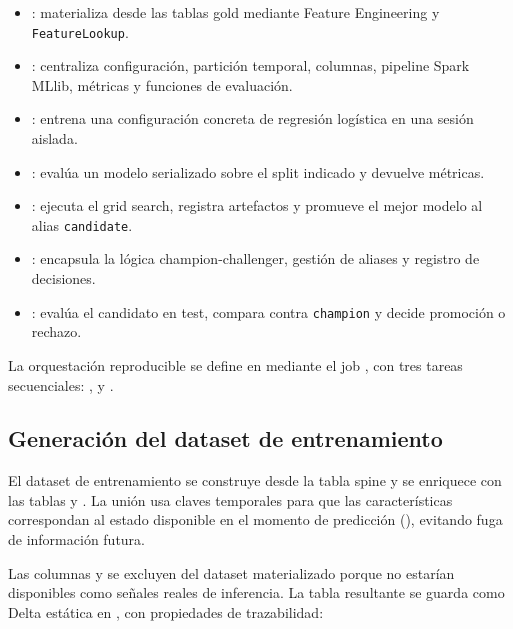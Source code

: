 \documentclass[12pt,a4paper]{article}
\begin{document}
\begin{itemize}
    \item {}: materializa  desde las tablas gold mediante Feature Engineering y \texttt{FeatureLookup}.
    \item {}: centraliza configuración, partición temporal, columnas, pipeline Spark MLlib, métricas y funciones de evaluación.
    \item {}: entrena una configuración concreta de regresión logística en una sesión aislada.
    \item {}: evalúa un modelo serializado sobre el split indicado y devuelve métricas.
    \item {}: ejecuta el grid search, registra artefactos y promueve el mejor modelo al alias \texttt{candidate}.
    \item {}: encapsula la lógica champion-challenger, gestión de aliases y registro de decisiones.
    \item {}: evalúa el candidato en test, compara contra \texttt{champion} y decide promoción o rechazo.
\end{itemize}

La orquestación reproducible se define en  mediante el job , con tres tareas secuenciales: ,  y .

\subsection{Generación del dataset de entrenamiento}

El dataset de entrenamiento se construye desde la tabla spine  y se enriquece con las tablas  y . La unión usa claves temporales para que las características correspondan al estado disponible en el momento de predicción (), evitando fuga de información futura.

Las columnas  y  se excluyen del dataset materializado porque no estarían disponibles como señales reales de inferencia. La tabla resultante se guarda como Delta estática en , con propiedades de trazabilidad:
\end{document}
